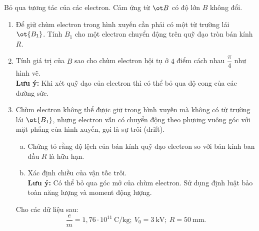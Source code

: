 \begin{vd}
{
}
Bỏ qua tương tác của các electron. Cảm ứng từ $\ot B$ có độ lớn $B$ không đổi.
\begin{enumerate}[1)]
    \item Để giữ chùm electron trong hình xuyến cần phải có một từ trường lái $\ot{B_1}$. Tính $B_1$ cho một electron chuyển động trên quỹ đạo tròn bán kính $R$.
    \item Tính giá trị của $B$ sao cho chùm electron hội tụ ở $4$ điểm cách nhau $\dfrac{\pi}{4}$ như hình vẽ. \\
    \textbf{Lưu ý:} Khi xét quỹ đạo của electron thì có thể bỏ qua độ cong của các đường sức.
    \item Chùm electron không thể được giữ trong hình xuyến mà không có từ trường lái $\ot{B_1}$, nhưng electron vẫn có chuyển động theo phương vuông góc với mặt phẳng của hình xuyến, gọi là sự trôi (drift).
    \begin{enumerate}[a)]
        \item Chứng  tỏ rằng độ lệch của bán kính quỹ đạo electron so với bán kính ban đầu $R$ là hữu hạn.
        \item Xác định chiều của vận tốc trôi.\\
        \textbf{Lưu ý:} Có thể bỏ qua góc mở của chùm electron. Sử dụng định luật bảo toàn năng lượng và moment động lượng.
    \end{enumerate}
Cho các dữ liệu sau:
\[\dfrac{e}{m} = 1,76 \cdot 10^{11} ~\mathrm{C/kg}; \ V_0 = 3~\mathrm{kV}; \ R = 50 ~\mathrm{mm}.\]
\end{enumerate}
\end{vd}
